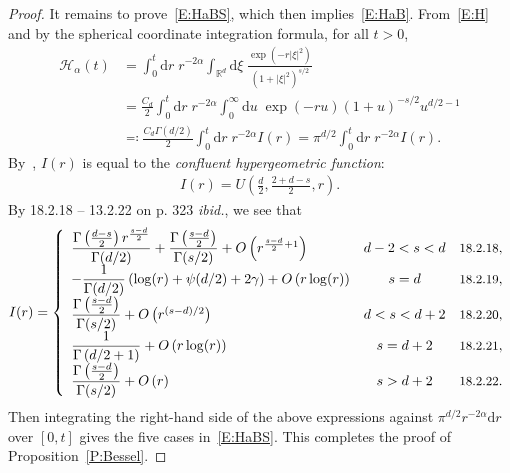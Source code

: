 \documentclass[sn-mathphys]{sn-jnl}%
\newcommand{\BR}{\mathbb{R}}
\newcommand{\ud}{\ensuremath{\mathrm{d}}}
\numberwithin{equation}{section}
\theoremstyle{thmstyleone}%
\theoremstyle{thmstyletwo}%
\theoremstyle{thmstylethree}%
\begin{document}
\begin{proof}
  It remains to prove~\eqref{E:HaBS}, which then implies~\eqref{E:HaB}. From~\eqref{E:H} and by the
  spherical coordinate integration formula, for all $t>0$,
  \begin{align*}
    \mathcal{H}_{\alpha}(t)
    & = \int_0^t \ud r \; r^{-2\alpha} \int_{\BR^d} \ud \xi \; \frac{\exp(-r\lvert\xi\rvert^2)}{(1+\lvert\xi\rvert^2)^{s/2}} \\
    & = \frac{C_d}{2} \int_0^t \ud r \; r^{-2\alpha} \int_0^\infty \ud u \; \exp(-r u)(1+u)^{-s/2} u^{d/2-1} \\
    & \eqqcolon \frac{C_d \Gamma\left(d/2\right)}{2} \int_0^t \ud r \; r^{-2\alpha} I(r) = \pi^{d/2}\int_0^t \ud r \; r^{-2\alpha} I(r).
  \end{align*}
  By~\cite[13.4.4 on p.326]{olver.lozier.ea:10:nist}, $I(r)$ is equal to the \textit{confluent
  hypergeometric function}:
  \begin{align}\label{E:ConHyGe}
    I(r) =U\left(\frac{d}{2},\frac{2+d-s}{2},r\right).
  \end{align}
  By 18.2.18 -- 13.2.22 on p. 323 \textit{ibid.}, we see that \renewcommand{\arraystretch}{2}
  \begin{align*}
    I(r) = \left\{
      \begin{array}{lcl}
        \dfrac{\Gamma\left(\frac{d-s}{2}\right)r^{\frac{s-d}{2}}}{\Gamma(d/2)}+\dfrac{\Gamma\left(\frac{s-d}{2}\right)}{\Gamma(s/2)} + O\left(r^{\frac{s-d}{2}+1}\right) & d-2<s<d & \text{\small 18.2.18}, \\
        -\dfrac{1}{\Gamma(d/2)}\left(\log(r) + \psi(d/2) + 2\gamma \right) +O\left(r\log(r)\right)                                                                       & s=d     & \text{\small 18.2.19}, \\
        \dfrac{\Gamma\left(\frac{s-d}{2}\right)}{\Gamma(s/2)} + O\left(r^{(s-d)/2}\right)                                                                                & d<s<d+2 & \text{\small 18.2.20}, \\
        \dfrac{1}{\Gamma\left(d/2+1\right)} + O\left(r\log(r)\right)                                                                                                     & s=d+2   & \text{\small 18.2.21}, \\
        \dfrac{\Gamma\left(\frac{s-d}{2}\right)}{\Gamma(s/2)} + O\left(r\right)                                                                                          & s>d+2   & \text{\small 18.2.22}. \\
      \end{array}
      \right.
  \end{align*}
  Then integrating the right-hand side of the above expressions against $\pi^{d/2}r^{-2\alpha}\ud r$
  over $[0,t]$ gives the five cases in~\eqref{E:HaBS}. This completes the proof of
  Proposition~\ref{P:Bessel}.
\end{proof}
\end{document}
